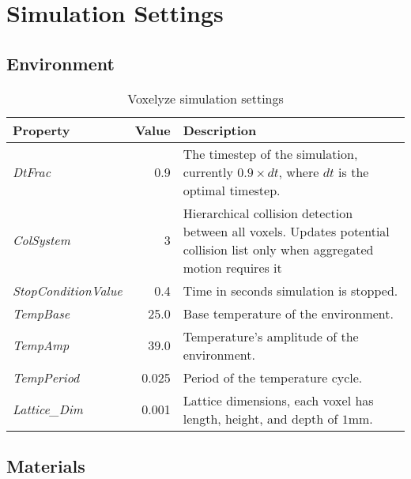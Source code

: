 
\chapter{Simulation Settings} %

\label{AppendixA} %



\section{Environment}

\begin{table}[ht!]
\centering
\caption{Voxelyze simulation settings}
\label{VoxelyzeSimulationSettings}
    \begin{tabular}{l r p{9cm}}
    \toprule
    \textbf{Property} & \textbf{Value} & \textbf{Description}\\
    \midrule
    \emph{DtFrac} & 0.9 & The timestep of the simulation, currently $0.9 \times dt$, where $dt$ is the optimal timestep.\\
    \emph{ColSystem}        & 3 & Hierarchical collision detection between all voxels. Updates potential collision list only when aggregated motion requires it\footnote.\\
    \emph{StopConditionValue} & 0.4 & Time in seconds simulation is stopped.\\
    \emph{TempBase} & 25.0 & Base temperature of the environment.\\
    \emph{TempAmp} & 39.0 & Temperature's amplitude of the environment.\\
    \emph{TempPeriod} & 0.025 & Period of the temperature cycle.\\
    \emph{Lattice\_Dim} & 0.001 & Lattice dimensions, each voxel has length, height, and depth of $1$mm.\\
    \bottomrule
    \end{tabular}
\end{table}




\section{Materials}

